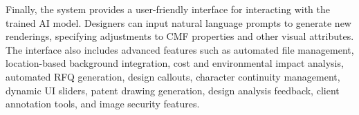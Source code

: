 \documentclass{article}
\begin{document}
Finally, the system provides a user-friendly interface for interacting with the trained AI model. Designers can input natural language prompts to generate new renderings, specifying adjustments to CMF properties and other visual attributes. The interface also includes advanced features such as automated file management, location-based background integration, cost and environmental impact analysis, automated RFQ generation, design callouts, character continuity management, dynamic UI sliders, patent drawing generation, design analysis feedback, client annotation tools, and image security features.







\end{document}
